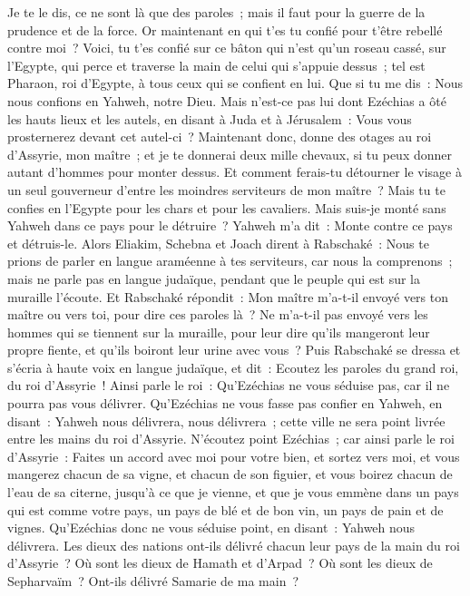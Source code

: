 \begin{multicols}{2}
Je te le dis, ce ne sont là que des paroles~; mais il faut pour la guerre de la prudence et de la force. Or maintenant en qui t'es tu confié pour t'être rebellé contre moi~?
Voici, tu t'es confié sur ce bâton qui n'est qu'un roseau cassé, sur l'Egypte, qui perce et traverse la main de celui qui s'appuie dessus~; tel est Pharaon, roi d'Egypte, à tous ceux qui se confient en lui.
Que si tu me dis~: Nous nous confions en Yahweh, notre Dieu. Mais n'est-ce pas lui dont Ezéchias a ôté les hauts lieux et les autels, en disant à Juda et à Jérusalem~: Vous vous prosternerez devant cet autel-ci~?
Maintenant donc, donne des otages au roi d'Assyrie, mon maître~; et je te donnerai deux mille chevaux, si tu peux donner autant d'hommes pour monter dessus.
Et comment ferais-tu détourner le visage à un seul gouverneur d'entre les moindres serviteurs de mon maître~? Mais tu te confies en l'Egypte pour les chars et pour les cavaliers.
Mais suis-je monté sans Yahweh dans ce pays pour le détruire~? Yahweh m'a dit~: Monte contre ce pays et détruis-le.
Alors Eliakim, Schebna et Joach dirent à Rabschaké~: Nous te prions de parler en langue araméenne à tes serviteurs, car nous la comprenons~; mais ne parle pas en langue judaïque, pendant que le peuple qui est sur la muraille l'écoute.
Et Rabschaké répondit~: Mon maître m'a-t-il envoyé vers ton maître ou vers toi, pour dire ces paroles là~? Ne m'a-t-il pas envoyé vers les hommes qui se tiennent sur la muraille, pour leur dire qu'ils mangeront leur propre fiente, et qu'ils boiront leur urine avec vous~?
Puis Rabschaké se dressa et s'écria à haute voix en langue judaïque, et dit~: Ecoutez les paroles du grand roi, du roi d'Assyrie~!
Ainsi parle le roi~: Qu'Ezéchias ne vous séduise pas, car il ne pourra pas vous délivrer.
Qu'Ezéchias ne vous fasse pas confier en Yahweh, en disant~: Yahweh nous délivrera, nous délivrera~; cette ville ne sera point livrée entre les mains du roi d'Assyrie.
N'écoutez point Ezéchias~; car ainsi parle le roi d'Assyrie~: Faites un accord avec moi pour votre bien, et sortez vers moi, et vous mangerez chacun de sa vigne, et chacun de son figuier, et vous boirez chacun de l'eau de sa citerne,
jusqu'à ce que je vienne, et que je vous emmène dans un pays qui est comme votre pays, un pays de blé et de bon vin, un pays de pain et de vignes.
Qu'Ezéchias donc ne vous séduise point, en disant~: Yahweh nous délivrera. Les dieux des nations ont-ils délivré chacun leur pays de la main du roi d'Assyrie~?
Où sont les dieux de Hamath et d'Arpad~? Où sont les dieux de Sepharvaïm~? Ont-ils délivré Samarie de ma main~?

\end{multicols}

